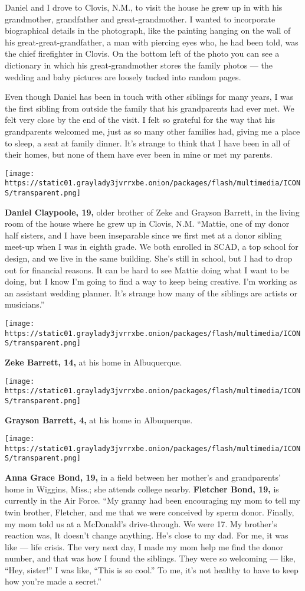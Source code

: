 Daniel and I drove to Clovis, N.M., to visit the house he grew up in
with his grandmother, grandfather and great-grandmother. I wanted to
incorporate biographical details in the photograph, like the painting
hanging on the wall of his great-great-grandfather, a man with piercing
eyes who, he had been told, was the chief firefighter in Clovis. On the
bottom left of the photo you can see a dictionary in which his
great-grandmother stores the family photos --- the wedding and baby
pictures are loosely tucked into random pages.

Even though Daniel has been in touch with other siblings for many years,
I was the first sibling from outside the family that his grandparents
had ever met. We felt very close by the end of the visit. I felt so
grateful for the way that his grandparents welcomed me, just as so many
other families had, giving me a place to sleep, a seat at family dinner.
It's strange to think that I have been in all of their homes, but none
of them have ever been in mine or met my parents.

\texttt{[image: https://static01.graylady3jvrrxbe.onion/packages/flash/multimedia/ICONS/transparent.png]}

\textbf{Daniel Claypoole, 19,} older brother of Zeke and Grayson
Barrett, in the living room of the house where he grew up in Clovis,
N.M. ``Mattie, one of my donor half sisters, and I have been inseparable
since we first met at a donor sibling meet-up when I was in eighth
grade. We both enrolled in SCAD, a top school for design, and we live in
the same building. She's still in school, but I had to drop out for
financial reasons. It can be hard to see Mattie doing what I want to be
doing, but I know I'm going to find a way to keep being creative. I'm
working as an assistant wedding planner. It's strange how many of the
siblings are artists or musicians.''

\texttt{[image: https://static01.graylady3jvrrxbe.onion/packages/flash/multimedia/ICONS/transparent.png]}

\textbf{Zeke Barrett, 14,} at his home in Albuquerque.

\texttt{[image: https://static01.graylady3jvrrxbe.onion/packages/flash/multimedia/ICONS/transparent.png]}

\textbf{Grayson Barrett, 4,} at his home in Albuquerque.

\texttt{[image: https://static01.graylady3jvrrxbe.onion/packages/flash/multimedia/ICONS/transparent.png]}

\textbf{Anna Grace Bond, 19,} in a field between her mother's and
grandparents' home in Wiggins, Miss.; she attends college nearby.
\textbf{Fletcher Bond, 19,} is currently in the Air Force. ``My granny
had been encouraging my mom to tell my twin brother, Fletcher, and me
that we were conceived by sperm donor. Finally, my mom told us at a
McDonald's drive-through. We were 17. My brother's reaction was, It
doesn't change anything. He's close to my dad. For me, it was like ---
life crisis. The very next day, I made my mom help me find the donor
number, and that was how I found the siblings. They were so welcoming
--- like, ``Hey, sister!'' I was like, ``This is so cool.'' To me, it's
not healthy to have to keep how you're made a secret.''

